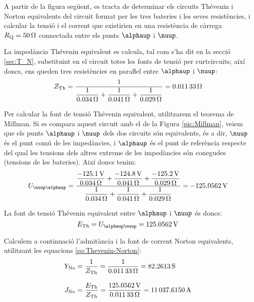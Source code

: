 \begin{exemple}
    A partir de la figura següent, es tracta de determinar els circuits
    Thévenin i Norton equivalents del circuit format per les tres
    bateries i les seves resistències, i calcular la tensió i el
    corrent que existirien en una resistència de càrrega
    $R_\mathrm{Q}=\SI{50}{\ohm}$ connectada entre els punts $\alphaup$
    i $\nuup$.

    \begin{center}
        
    \end{center}

    La impedància Thévenin equivalent es calcula, tal com s'ha dit en la secció \ref{sec:T_N},
    substituint en el circuit totes les fonts de tensió per curtcircuits; així doncs, ens
    queden tres resistències en paraŀlel entre $\alphaup$ i $\nuup$:
    \[
    Z_\mathrm{Th} = \frac{1}{\dfrac{1}{\SI{0,034}{\ohm}} +
    \dfrac{1}{\SI{0,041}{\ohm}} + \dfrac{1}{\SI{0,029}{\ohm}}} =
    \SI{0,01133}{\ohm}
    \]

    Per calcular la font de tensió Thévenin equivalent, utilitzarem el
    teorema de Millman. Si es compara aquest circuit amb el de la Figura
    \vref{pic:Millman}, veiem que els punts $\alphaup$ i $\nuup$ dels dos
    circuits són equivalents, és a dir, $\nuup$ és el punt comú de les
    impedàncies, i $\alphaup$ és el punt de referència respecte del qual les tensions  dels altres extrems de les impedàncies
    són conegudes
    (tensions de les bateries). Així doncs tenim:
    \[
    U_{\nuup\alphaup} = \frac{\dfrac{\SI{-125,1}{V}}{\SI{0,034}{\ohm}} +
    \dfrac{\SI{-124,8}{V}}{\SI{0,041}{\ohm}} +
    \dfrac{\SI{-125,2}{V}}{\SI{0,029}{\ohm}}}{\dfrac{1}{\SI{0,034}{\ohm}}
    + \dfrac{1}{\SI{0,041}{\ohm}} + \dfrac{1}{\SI{0,029}{\ohm}}} =
    \SI{-125,0562}{V}
    \]

    La font de tensió  Thévenin equivalent entre $\alphaup$ i $\nuup$ és doncs:
    \[
    E\ped{Th} = U_{\alphaup\nuup} = \SI{125,0562}{V}
    \]

    Calculem a continuació l'admitància i la font de corrent  Norton equivalents, utilitzant
    les equacions \eqref{eq:Thevenin-Norton}:
    \begin{align*}
        Y_\mathrm{No} &= \frac{1}{Z_\mathrm{Th}} = \frac{1}{\SI{0,01133}{\ohm}} = \SI{82,2613}{S}
        \\[2ex]
        J_\mathrm{No} &= \frac{E_\mathrm{Th}}{Z_\mathrm{Th}} =
        \frac{\SI{125,0562}{V}}{\SI{0,01133}{\ohm}}= \SI{11037,6150}{A}
    \end{align*}


\end{exemple}

